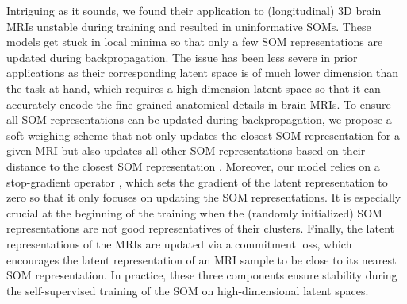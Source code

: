 \documentclass[runningheads]{llncs}
\begin{document}
Intriguing as it sounds, we found their application to (longitudinal) 3D brain MRIs unstable during training and resulted in uninformative SOMs. These models get stuck in local minima so that only a few SOM representations are updated during backpropagation. The issue has been less severe in prior applications\cite{fortuin2018som,manduchi2019dpsom} as their corresponding latent space is of much lower dimension than the task at hand, which requires a high dimension latent space so that it can accurately encode the fine-grained anatomical details in brain MRIs\cite{zhao2020lssl,ouyang2021self}. To ensure all SOM representations can be updated during backpropagation, we propose a soft weighing scheme that not only updates the closest SOM representation for a given MRI but also updates all other SOM representations based on their distance to the closest SOM representation \cite{fortuin2018som,manduchi2019dpsom}. 
Moreover, our model relies on a stop-gradient operator \cite{van2017neural}, which sets the gradient of the latent representation to zero so that it only focuses on updating the SOM representations. It is especially crucial at the beginning of the training when the (randomly initialized) SOM representations are not good representatives of their clusters. Finally, the latent representations of the MRIs are updated via a commitment loss, which encourages the latent representation of an MRI sample to be close to its nearest SOM representation. In practice, these three components ensure stability during the self-supervised training of the SOM on high-dimensional latent spaces.

\end{document}
